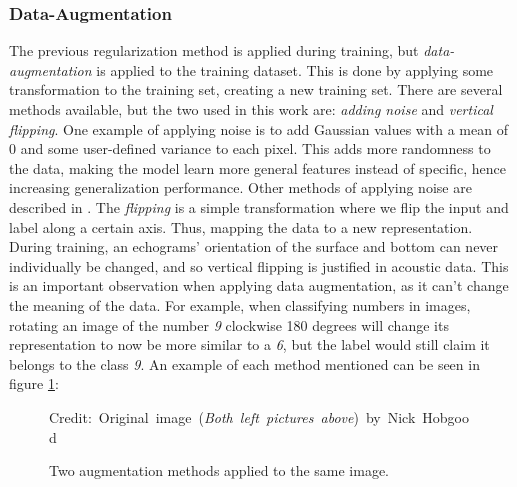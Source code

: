 \subsubsection{Data-Augmentation} \label{data-augmentation}
    The previous regularization method is applied during training, but \textit{data-augmentation} is applied to the training dataset\cite{kukavcka2017_regularization}. This is done by applying some transformation to the training set, creating a new training set. There are several methods available, but the two used in this work are: \textit{adding noise} and \textit{vertical flipping}. One example of applying noise is to add Gaussian values with a mean of 0 and some user-defined variance to each pixel. This adds more randomness to the data, making the model learn more general features instead of specific, hence increasing generalization performance. Other methods of applying noise are described in \citeauthor{kukavcka2017_regularization}\cite{kukavcka2017_regularization}. The \textit{flipping} is a simple transformation where we flip the input and label along a certain axis. Thus, mapping the data to a new representation. During training, an echograms' orientation of the surface and bottom can never individually be changed, and so vertical flipping is justified in acoustic data. This is an important observation when applying data augmentation, as it can't change the meaning of the data. For example, when classifying numbers in images, rotating an image of the number \textit{9} clockwise 180 degrees will change its representation to now be more similar to a \textit{6}, but the label would still claim it belongs to the class \textit{9}. An example of each method mentioned can be seen in figure \ref{data augmentation fig}:
    
    \begin{figure}[H]
        \centering
        
        
        
        
        \caption[Two data augmentation examples]{Two augmentation methods applied to the same image.}
        \medskip 
        \hspace*{15pt}\hbox{\scriptsize Credit: Original image (\textit{Both left pictures above}) by Nick Hobgood\cite{clownfish_image}}
        \label{data augmentation fig}
        
        \end{figure}
    
